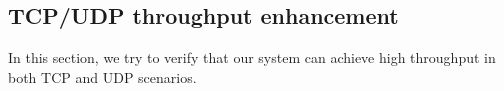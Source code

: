 
\subsection{TCP/UDP throughput enhancement}
\label{sec:tcp}

In this section, we try to verify that our system can achieve high throughput in both TCP and UDP scenarios. 

\begin{figure}[htb]
\end{figure}
